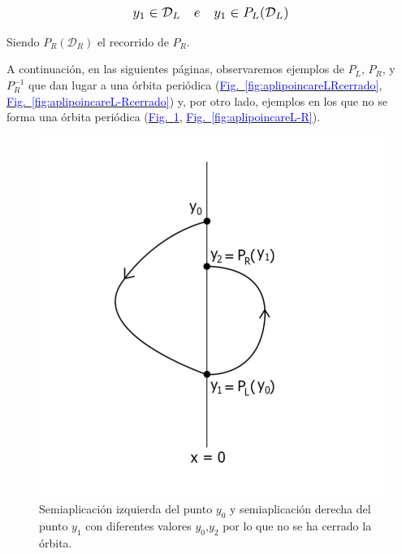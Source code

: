 \documentclass[12pt,a4paper]{report} %
\newcommand{\fref}[1]{\hyperref[#1]{\textcolor{blue}{Fig.~\ref*{#1}}}}
\newcommand{\fref}[1]{\hyperref[#1]{\textcolor{blue}{\textit{Fig.~\ref*{#1}}}}}
\begin{document}
	\begin{equation*}
		\scalebox{1.2}{$\displaystyle
			y_1 \in \mathcal{D}_L \quad e \quad y_1\in P_L(\mathcal{D}_L)
			$}
	\end{equation*}\smallskip
	
	\noindent Siendo $ P_R(\mathcal{D}_R)$ el recorrido de $P_R$.
	
	\vspace{1cm}\noindent A continuación, en las siguientes páginas, observaremos ejemplos de $P_L$, $P_R$, y $P_R^{-1}$ que dan lugar a una órbita periódica (\fref{fig:aplipoincareLRcerrado}, \fref{fig:aplipoincareL-Rcerrado}) y, por otro lado, ejemplos en los que no se forma una órbita periódica (\fref{fig:aplipoincareLR}, \fref{fig:aplipoincareL-R}).
	
	\newpage
	
	 \begin{figure}[h]
		\centering
		\includegraphics[width=1.1\textwidth,center]{aplipoincareLR.jpg}
		\caption{Semiaplicación izquierda del punto $y_0$ y semiaplicación derecha del punto $y_1$ con diferentes valores $y_0$,$y_2$ por lo que no se ha cerrado la órbita.}
		\label{fig:aplipoincareLR}
	\end{figure}\smallskip
	
	\newpage
	
\end{document}
